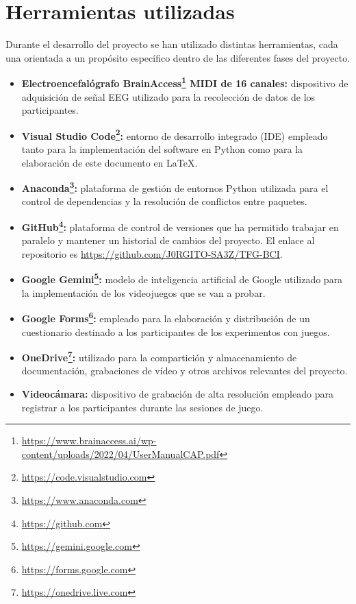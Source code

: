 \section{Herramientas utilizadas}
Durante el desarrollo del proyecto se han utilizado distintas herramientas,
cada una orientada a un propósito específico dentro de las diferentes fases del
proyecto.

\begin{itemize}
    \item \textbf{Electroencefalógrafo BrainAccess\footnote{\url{https://www.brainaccess.ai/wp-content/uploads/2022/04/UserManualCAP.pdf}} MIDI de 16 canales:} dispositivo de adquisición de señal EEG utilizado para la recolección de datos de los participantes.

    \item \textbf{Visual Studio Code\footnote{\url{https://code.visualstudio.com}}:} entorno de desarrollo integrado (IDE) empleado tanto para la implementación del software en Python como para la elaboración de este documento en \LaTeX.
    
    \item \textbf{Anaconda\footnote{\url{https://www.anaconda.com}}:} plataforma de gestión de entornos Python utilizada para el control de dependencias y la resolución de conflictos entre paquetes.

    \item \textbf{GitHub\footnote{\url{https://github.com}}:} plataforma de control de versiones que ha permitido trabajar en paralelo y mantener un historial de cambios del proyecto. El enlace al repositorio es \url{https://github.com/J0RGITO-SA3Z/TFG-BCI}.
    
    \item \textbf{Google Gemini\footnote{\url{https://gemini.google.com}}:} modelo de inteligencia artificial de Google utilizado para la implementación de los videojuegos que se van a probar.

    \item \textbf{Google Forms\footnote{\url{https://forms.google.com}}:} empleado para la elaboración y distribución de un cuestionario destinado a los participantes de los experimentos con juegos.
    
    \item \textbf{OneDrive\footnote{\url{https://onedrive.live.com}}:} utilizado para la compartición y almacenamiento de documentación, grabaciones de vídeo y otros archivos relevantes del proyecto.
    
    \item \textbf{Videocámara:} dispositivo de grabación de alta resolución empleado para registrar a los participantes durante las sesiones de juego.
\end{itemize}

